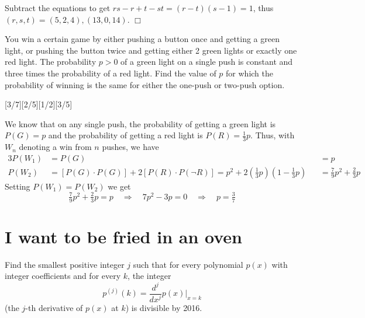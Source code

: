 \begin{solution}[A]
    Subtract the equations to get $rs-r+t-st=(r-t)(s-1)=1$, thus $(r,s,t)=(5,2,4) , (13,0,14)$. $\Box$
\end{solution}

\begin{problem}
    You win a certain game by either pushing a button once and getting a green light, or pushing the button twice and getting either 2 green lights or exactly one red light. The probability $p > 0$ of a green light on a single push is constant and three times the probability of a red light. Find the value of $p$ for which the probability of winning is the same for either the one-push or two-push option.
\end{problem}
[3/7][2/5][1/2][3/5]

\begin{solution}[B]
    We know that on any single push, the probability of getting a green light is $P(G)=p$ and the probability of getting a red light is $P(R)=\frac{1}{3}p$. Thus, with $W_n$ denoting a win from $n$ pushes, we have
    \begin{alignat*}{3}
        P(W_1) &= P(G) &&= p\\
        P(W_2) &= [P(G) \cdot P(G)] + 2[P(R) \cdot P(\neg R)] = p^2 + 2\left(\tfrac{1}{3}p\right)\left(1-\tfrac{1}{3}p\right) &&= \tfrac{7}{9}p^2 + \tfrac{2}{3}p
    \end{alignat*}
    Setting $P(W_1)=P(W_2)$ we get
    \[
        \tfrac{7}{9}p^2 + \tfrac{2}{3}p = p \quad \Rightarrow \quad 7p^2 - 3p = 0 \quad \Rightarrow \quad p = \boxed{\tfrac{3}{7}}
    \]
\end{solution}

\newpage
\section*{I want to be fried in an oven}

\begin{problem}[R][3][Putnam 2016 /A1]
    Find the smallest positive integer \( j \) such that for every polynomial \( p(x) \) with integer coefficients and for every \( k \), the integer
\[
p^{(j)}(k) = \frac{d^j}{dx^j}p(x) \bigg|_{x=k}
\]
(the \( j \)-th derivative of \( p(x) \) at \( k \)) is divisible by 2016.
\end{problem}

